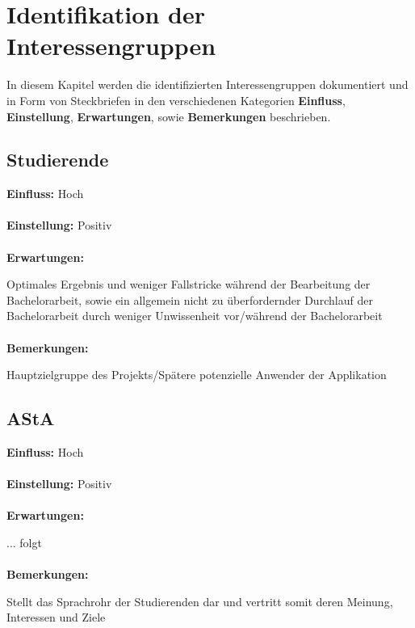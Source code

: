 \documentclass{scrreprt}
\begin{document}
\section{Identifikation der Interessengruppen}
\par In diesem Kapitel werden die identifizierten Interessengruppen dokumentiert und in Form von Steckbriefen in den verschiedenen Kategorien \textbf{Einfluss}, \textbf{Einstellung}, \textbf{Erwartungen}, sowie \textbf{Bemerkungen} beschrieben.  
\subsection{Studierende}
\textbf{Einfluss:} Hoch\\\\
\textbf{Einstellung:} Positiv\\\\
\textbf{Erwartungen:}\par Optimales Ergebnis und weniger \glqq Fallstricke\grqq{} während der Bearbeitung der Bachelorarbeit, sowie ein allgemein \glqq nicht zu überfordernder\grqq{} Durchlauf der Bachelorarbeit durch weniger Unwissenheit vor/während der Bachelorarbeit\\\\
\textbf{Bemerkungen:}\par Hauptzielgruppe des Projekts/Spätere potenzielle Anwender der Applikation

\subsection{AStA}
\textbf{Einfluss:} Hoch\\\\
\textbf{Einstellung:} Positiv\\\\
\textbf{Erwartungen:}\par ... folgt\\\\
\textbf{Bemerkungen:}\par Stellt das Sprachrohr der Studierenden dar und vertritt somit deren Meinung, Interessen und Ziele
\newpage
\end{document}
